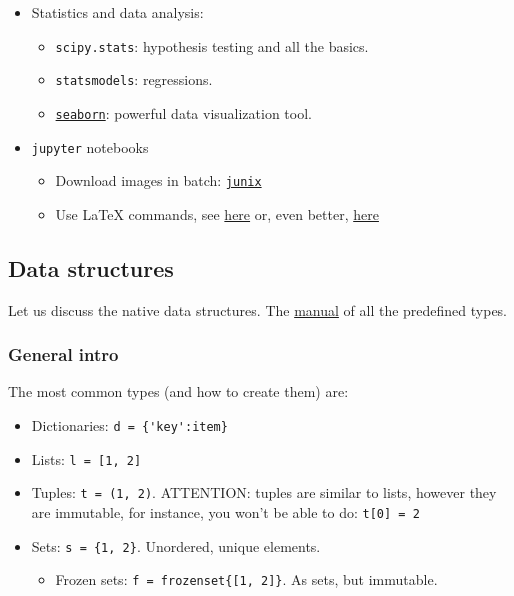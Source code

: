 \documentclass[a4paper,12pt,%
              final%
              ]{article}
\begin{document}
\begin{itemize}
  \item Statistics and data analysis:
    \begin{itemize}
      \item \texttt{scipy.stats}: hypothesis testing and all the basics.
      \item \texttt{statsmodels}: regressions.
      \item \href{https://seaborn.pydata.org/introduction.html}{\texttt{seaborn}}: powerful data visualization tool.
    \end{itemize}
  \item \texttt{jupyter} notebooks
    \begin{itemize}
      \item Download images in batch: \href{https://github.com/damienmarlier51/JupyterNotebookImageExporter}{\texttt{junix}}
      \item Use \LaTeX{} commands, see \href{https://stackoverflow.com/questions/13208286/how-to-write-latex-in-ipython-notebook}{here} or, even better, \href{https://jupyterbook.org/content/math.html}{here}
      \end{itemize}
\end{itemize}

\subsection{Data structures}
Let us discuss the native data structures. The \href{https://docs.python.org/3/library/stdtypes.html}{manual} of all the predefined types.
\subsubsection{General intro}
The most common types (and how to create them) are:
\begin{itemize}
  \item Dictionaries: \verb|d = {'key':item}|
  \item Lists: \verb|l = [1, 2]|
  \item Tuples: \verb|t = (1, 2)|. ATTENTION: tuples are similar to lists, however they are immutable, for instance, you won't be able to do: \verb|t[0] = 2|
  \item Sets: \verb|s = {1, 2}|. Unordered, unique elements.
    \begin{itemize}
      \item Frozen sets: \verb|f = frozenset{[1, 2]}|. As sets, but immutable.
    \end{itemize}
\end{itemize}
\end{document}
